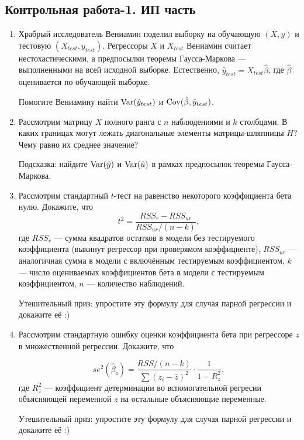 \subsection{Контрольная работа-1. ИП часть}

\begin{enumerate}
  \item Храбрый исследователь Вениамин поделил выборку на обучающую $(X, y)$ и тестовую $(X_{test}, y_{test})$.
  Регрессоры $X$ и $X_{test}$ Вениамин считает нестохастическими, а предпосылки
  теоремы Гаусса-Маркова — выполненными на всей исходной выборке. Естественно,
  $\hat y_{test} = X_{test}\hat\beta$, где $\hat\beta$ оценивается по обучающей выборке.

  Помогите Вениамину найти $\operatorname{Var}(\hat y_{test})$ и $\operatorname{Cov}(\hat \beta, \hat y_{test})$.

  \item Рассмотрим матрицу $X$ полного ранга с $n$ наблюдениями и $k$ столбцами.
  В каких границах могут лежать диагональные элементы матрицы-шляпницы $H$?
  Чему равно их среднее значение?

  Подсказка: найдите $\operatorname{Var}(\hat y)$ и $\operatorname{Var}(\hat u)$ в рамках предпосылок теоремы Гаусса-Маркова.

  \item Рассмотрим стандартный $t$-тест на равенство некоторого коэффициента бета нулю.
  Докажите, что
  \[
         t^2 = \frac{RSS_r - RSS_{ur}}{RSS_{ur}/(n-k)},
  \]
  где $RSS_r$ — сумма квадратов остатков в модели без тестируемого коэффициента
  (выкинут регрессор при проверямом коэффициенте),
  $RSS_{ur}$ — аналогичная сумма в модели с включённым тестируемым коэффициентом, $k$ —
  число оцениваемых коэффициентов бета в модели с тестируемым коэффициентом, $n$ —
  количество наблюдений.

  Утешительный приз: упростите эту формулу для случая парной регрессии и докажите её :)

  \item Рассмотрим стандартную ошибку оценки коэффициента бета при регрессоре $z$
  в множественной регрессии.
  Докажите, что

  \[
         se^2(\hat\beta_z) = \frac{RSS / (n-k)}{\sum (z_i - \bar z)^2} \cdot \frac{1}{1 - R^2_z},
  \]
  где $R^2_z$ — коэффициент детерминации во вспомогательной регресии объясняющей переменной
  $z$ на остальные объясняющие переменные.

  Утешительный приз: упростите эту формулу для случая парной регрессии и докажите её :)



\end{enumerate}
